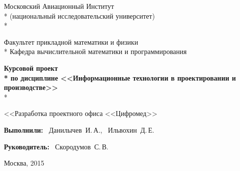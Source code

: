 \begin{titlepage}

\newpage

\begin{center}
Московский Авиационный Институт \\*
(национальный исследовательский университет) \\*

\vspace{2em}

Факультет прикладной математики и физики \\*
Кафедра вычислительной математики и программирования

\vspace{10em}

\Large \textbf{Курсовой проект \\*
по дисциплине <<Информационные технологии в проектировании и производстве>>} \\*

\vspace{3em}

<<Разработка проектного офиса <<Цифромед>>
\end{center}

\vspace{8em}

\hspace{25em}\vbox{
  \hbox{\bfseries{Выполнили:}}
  \hbox{\hspace{1em} Данилычев И.\,А.,}
  \hbox{\hspace{1em} Ильвохин Д.\,Е.}
}

\vspace{2em}

\hspace{25em}\vbox{
  \hbox{\bfseries{Руководитель:}}
  \hbox{\hspace{1em} Скородумов С.\,В.}
}

\vspace{\fill}

\begin{center}
Москва, 2015
\end{center}

\end{titlepage}
